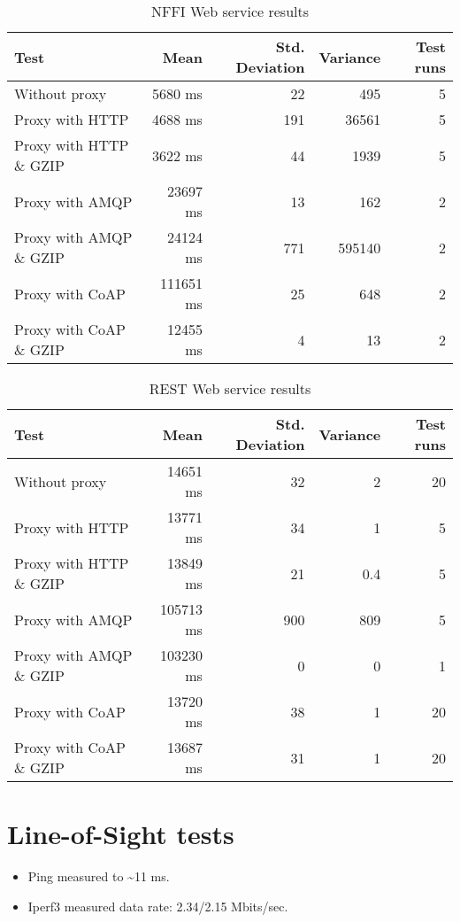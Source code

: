 \begin{appendices}
\begin{table}[H]
\begin{tabular}{| l | r | r | r | r |}
\hline
  \textbf{Test} & \textbf{Mean} & \textbf{Std. Deviation} & \textbf{Variance} & \textbf{Test runs}\\ \hline
  Without proxy & 5680 ms & 22 & 495 & 5 \\ \hline
  Proxy with HTTP & 4688 ms & 191 & 36561 & 5 \\ \hline
  Proxy with HTTP \& GZIP & 3622 ms & 44 & 1939 & 5 \\ \hline
  Proxy with AMQP & 23697 ms & 13 & 162 & 2 \\ \hline
  Proxy with AMQP \& GZIP & 24124 ms & 771 & 595140 & 2\\ \hline
  Proxy with CoAP & 111651 ms & 25 & 648 & 2 \\ \hline
  Proxy with CoAP \& GZIP & 12455 ms & 4 & 13 & 2 \\ \hline
\end{tabular}
\caption{NFFI Web service results}
\end{table}


\begin{table}[H]
\begin{tabular}{| l | r | r | r | r |}
\hline
  \textbf{Test} & \textbf{Mean} & \textbf{Std. Deviation} & \textbf{Variance} & \textbf{Test runs}\\ \hline
  Without proxy & 14651 ms & 32 & 2 & 20 \\ \hline
  Proxy with HTTP & 13771 ms & 34 & 1 & 5 \\ \hline
  Proxy with HTTP \& GZIP & 13849 ms & 21 & 0.4 & 5 \\ \hline
  Proxy with AMQP & 105713 ms & 900 & 809 & 5 \\ \hline
  Proxy with AMQP \& GZIP & 103230 ms & 0 & 0 & 1\\ \hline
  Proxy with CoAP & 13720 ms & 38 & 1 & 20 \\ \hline
  Proxy with CoAP \& GZIP & 13687 ms & 31 & 1 & 20 \\ \hline
\end{tabular}
\caption{REST Web service results}
\end{table}



\section{Line-of-Sight tests}

\begin{itemize}
	\item Ping measured to \textasciitilde 11 ms.
	\item Iperf3 measured data rate: 2.34/2.15 Mbits/sec.
\end{itemize}


\end{appendices}
